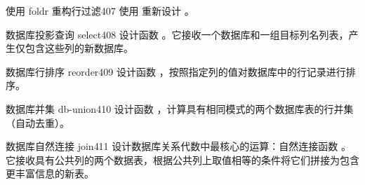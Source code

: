 \begin{exercise}{使用 foldr 重构行过滤}{407}
使用  重新设计 。
\end{exercise}

\begin{exercise}{数据库投影查询 select}{408}
设计函数 。它接收一个数据库和一组目标列名列表，产生仅包含这些列的新数据库。
\end{exercise}

\begin{exercise}{数据库行排序 reorder}{409}
设计函数 ，按照指定列的值对数据库中的行记录进行排序。
\end{exercise}

\begin{exercise}{数据库并集 db-union}{410}
设计函数 ，计算具有相同模式的两个数据库表的行并集（自动去重）。
\end{exercise}

\begin{exercise}{数据库自然连接 join}{411}
设计数据库关系代数中最核心的运算：自然连接函数 。它接收具有公共列的两个数据表，根据公共列上取值相等的条件将它们拼接为包含更丰富信息的新表。
\end{exercise}
